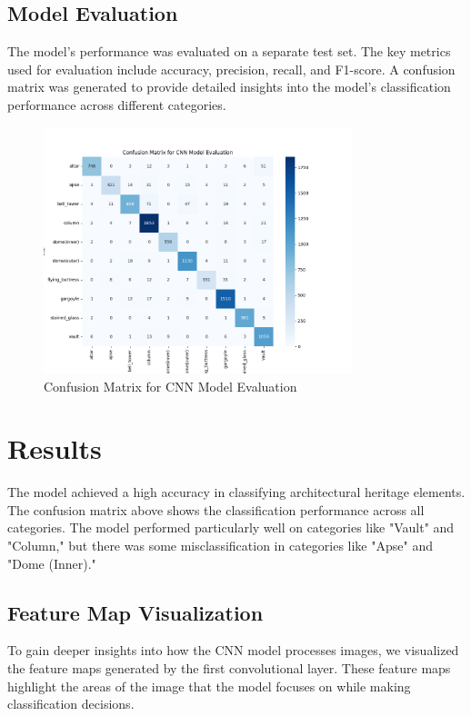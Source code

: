 \documentclass[12pt]{article}
\begin{document}
\subsection{Model Evaluation}
The model's performance was evaluated on a separate test set. The key metrics used for evaluation include accuracy, precision, recall, and F1-score. A confusion matrix was generated to provide detailed insights into the model's classification performance across different categories.

\begin{figure}[H]
    \centering
    \includegraphics[width=0.8\textwidth]{confusion_matrix.png}
    \caption{Confusion Matrix for CNN Model Evaluation}
\end{figure}

\section{Results}
The model achieved a high accuracy in classifying architectural heritage elements. The confusion matrix above shows the classification performance across all categories. The model performed particularly well on categories like "Vault" and "Column," but there was some misclassification in categories like "Apse" and "Dome (Inner)."

\subsection{Feature Map Visualization}
To gain deeper insights into how the CNN model processes images, we visualized the feature maps generated by the first convolutional layer. These feature maps highlight the areas of the image that the model focuses on while making classification decisions.
\end{document}
